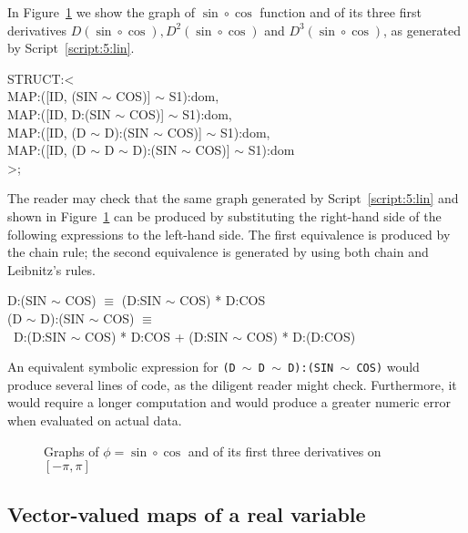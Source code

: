 \documentclass{31x47jw}
\begin{document}
\begin{example}
    
In Figure~\ref{figure:5:ex61} we show the graph of $\sin\circ\cos$
function and of its three first derivatives $D(\sin\circ\cos),
D^{2}(\sin\circ\cos)$ and $D^{3}(\sin\circ\cos)$, as generated by 
Script~\ref{script:5:lin}.
    
\begin{script}
\begin{smallplasm}
STRUCT:< \+\\
  MAP:([ID, (SIN $\sim$ COS)] $\sim$ S1):dom,\\
  MAP:([ID, D:(SIN $\sim$ COS)] $\sim$ S1):dom,\\
  MAP:([ID, (D $\sim$ D):(SIN $\sim$ COS)] $\sim$ S1):dom,\\
  MAP:([ID, (D $\sim$ D $\sim$ D):(SIN $\sim$ COS)] $\sim$ S1):dom\-\\
>;
\end{smallplasm}
\label{script:5:lin}
\end{script}
The reader may check that the same graph generated by
Script~\ref{script:5:lin} and shown in Figure~\ref{figure:5:ex61} can
be produced by substituting the right-hand side of the following
expressions to the left-hand side.  The first equivalence is produced
by the chain rule; the second equivalence is generated by using both
chain and Leibnitz's rules.
\begin{smallplasm}
D:(SIN $\sim$ COS) $\equiv$ (D:SIN  $\sim$  COS) * D:COS\\[0.3cm]
(D $\sim$ D):(SIN $\sim$ COS) $\equiv$ \+\\\
  D:(D:SIN $\sim$ COS) * D:COS  + (D:SIN $\sim$ COS) * D:(D:COS)
\end{smallplasm}
An equivalent symbolic expression for \texttt{(D $\sim$ D $\sim$
D):(SIN $\sim$ COS)} would produce several lines of code, as the
diligent reader might check.  Furthermore, it would require a longer
computation and would produce a greater numeric error when evaluated
on actual data.

\begin{figure}[htb]
\centering{}
\caption{Graphs of $\phi=\sin\circ\cos$ and of its first three derivatives 
on $[-\pi, \pi]$
\label{figure:5:ex61}}
\end{figure}

    
\end{example}

\subsection{Vector-valued maps of a real variable}
\end{document}

